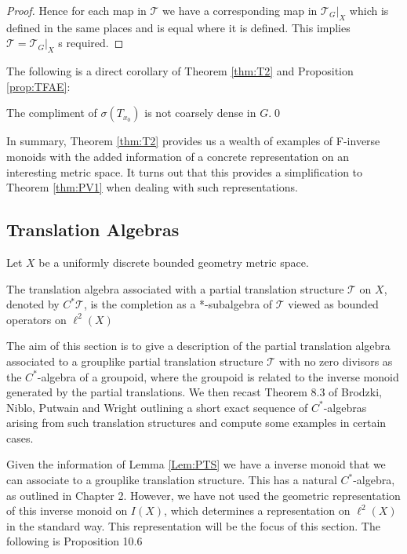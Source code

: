 \begin{corollary}
\begin{proof}
Hence for each map in $\mathcal{T}$ we have a corresponding map in $\mathcal{T}_{G}|_{X}$ which is defined in the same places and is equal where it is defined. This implies $\mathcal{T}=\mathcal{T}_{G}|_{X}$ s required.
\end{proof}

The following is a direct corollary of Theorem \ref{thm:T2} and Proposition \ref{prop:TFAE}:

\begin{corollary}
The compliment of $\sigma (T_{x_{0}})$ is not coarsely dense in $G$.\qed
\end{corollary}


In summary, Theorem \ref{thm:T2} provides us a wealth of examples of F-inverse monoids with the added information of a concrete representation on an interesting metric space. It turns out that this provides a simplification to Theorem \ref{thm:PV1} when dealing with such representations.

\subsection{Translation Algebras}
Let $X$ be a uniformly discrete bounded geometry metric space.

\begin{definition}
The translation algebra associated with a partial translation structure $\mathcal{T}$ on $X$, denoted by $C^{*}\mathcal{T}$, is the completion as a *-subalgebra of $\mathcal{T}$ viewed as bounded operators on $\ell^{2}(X)$
\end{definition}

The aim of this section is to give a description of the partial translation algebra associated to a grouplike partial translation structure $\mathcal{T}$ with no zero divisors as the $C^{*}$-algebra of a groupoid, where the groupoid is related to the inverse monoid generated by the partial translations. We then recast Theorem 8.3 of Brodzki, Niblo, Putwain and Wright \cite{rosiesthesis} outlining a short exact sequence of $C^{*}$-algebras arising from such translation structures and compute some examples in certain cases.

Given the information of Lemma \ref{Lem:PTS} we have a inverse monoid that we can associate to a grouplike translation structure. This has a natural $C^{*}$-algebra, as outlined in Chapter 2. However, we have not used the geometric representation of this inverse monoid on $I(X)$, which determines a representation on $\ell^{2}(X)$ in the standard way. This representation will be the focus of this section. The following is Proposition 10.6 \cite{MR2419901}


\end{corollary}
